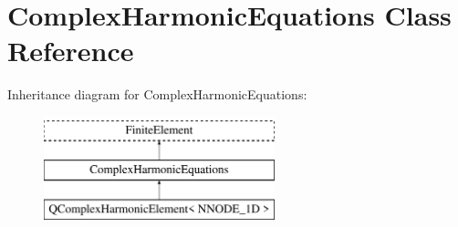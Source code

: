 \hypertarget{classComplexHarmonicEquations}{}\section{Complex\+Harmonic\+Equations Class Reference}
\label{classComplexHarmonicEquations}
Inheritance diagram for Complex\+Harmonic\+Equations\+:\begin{figure}[H]
\begin{center}
\leavevmode
\includegraphics[height=3.000000cm]{classComplexHarmonicEquations}
\end{center}
\end{figure}
